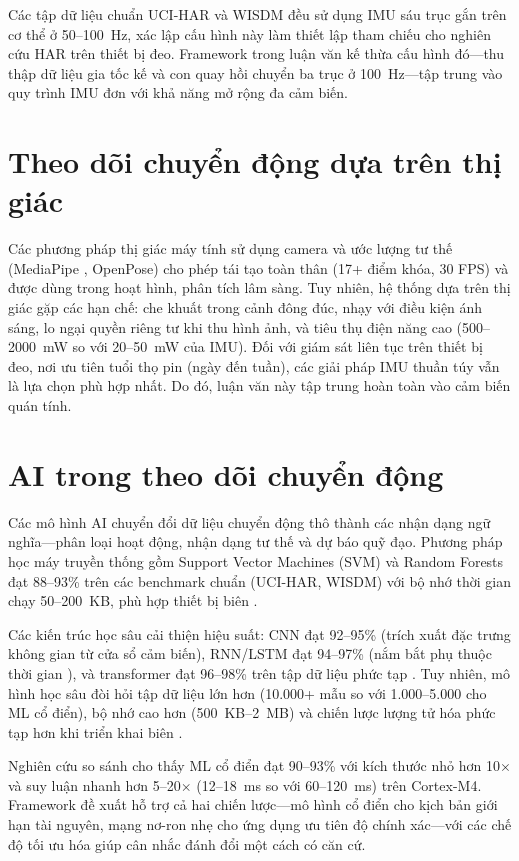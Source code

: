 Các tập dữ liệu chuẩn UCI-HAR \cite{anguita2013har} và WISDM \cite{banos2014wisdm} đều sử dụng IMU sáu trục gắn trên cơ thể ở 50--100~Hz, xác lập cấu hình này làm thiết lập tham chiếu cho nghiên cứu HAR trên thiết bị đeo. Framework trong luận văn kế thừa cấu hình đó---thu thập dữ liệu gia tốc kế và con quay hồi chuyển ba trục ở 100~Hz---tập trung vào quy trình IMU đơn với khả năng mở rộng đa cảm biến.

\section{Theo dõi chuyển động dựa trên thị giác}
Các phương pháp thị giác máy tính sử dụng camera và ước lượng tư thế (MediaPipe \cite{web:Google_Mediapipe}, OpenPose) cho phép tái tạo toàn thân (17+ điểm khóa, 30 FPS) và được dùng trong hoạt hình, phân tích lâm sàng. Tuy nhiên, hệ thống dựa trên thị giác gặp các hạn chế: che khuất trong cảnh đông đúc, nhạy với điều kiện ánh sáng, lo ngại quyền riêng tư khi thu hình ảnh, và tiêu thụ điện năng cao (500--2000~mW so với 20--50~mW của IMU). Đối với giám sát liên tục trên thiết bị đeo, nơi ưu tiên tuổi thọ pin (ngày đến tuần), các giải pháp IMU thuần túy vẫn là lựa chọn phù hợp nhất. Do đó, luận văn này tập trung hoàn toàn vào cảm biến quán tính.

\section{AI trong theo dõi chuyển động}
Các mô hình AI chuyển đổi dữ liệu chuyển động thô thành các nhận dạng ngữ nghĩa---phân loại hoạt động, nhận dạng tư thế và dự báo quỹ đạo. Phương pháp học máy truyền thống gồm Support Vector Machines (SVM) \cite{cortes1995svm} và Random Forests \cite{breiman2001random} đạt 88--93\% trên các benchmark chuẩn (UCI-HAR, WISDM) với bộ nhớ thời gian chạy 50--200~KB, phù hợp thiết bị biên \cite{wang2024har_comparative}.

Các kiến trúc học sâu cải thiện hiệu suất: CNN đạt 92--95\% (trích xuất đặc trưng không gian từ cửa sổ cảm biến), RNN/LSTM đạt 94--97\% (nắm bắt phụ thuộc thời gian \cite{xia2020lstm_har}), và transformer đạt 96--98\% trên tập dữ liệu phức tạp \cite{singh2023har_transformers}. Tuy nhiên, mô hình học sâu đòi hỏi tập dữ liệu lớn hơn (10.000+ mẫu so với 1.000--5.000 cho ML cổ điển), bộ nhớ cao hơn (500~KB--2~MB) và chiến lược lượng tử hóa phức tạp hơn khi triển khai biên \cite{lin2022mcunet}.

Nghiên cứu so sánh \cite{wang2024har_comparative} cho thấy ML cổ điển đạt 90--93\% với kích thước nhỏ hơn 10$\times$ và suy luận nhanh hơn 5--20$\times$ (12--18~ms so với 60--120~ms) trên Cortex-M4. Framework đề xuất hỗ trợ cả hai chiến lược---mô hình cổ điển cho kịch bản giới hạn tài nguyên, mạng nơ-ron nhẹ cho ứng dụng ưu tiên độ chính xác---với các chế độ tối ưu hóa giúp cân nhắc đánh đổi một cách có căn cứ.

